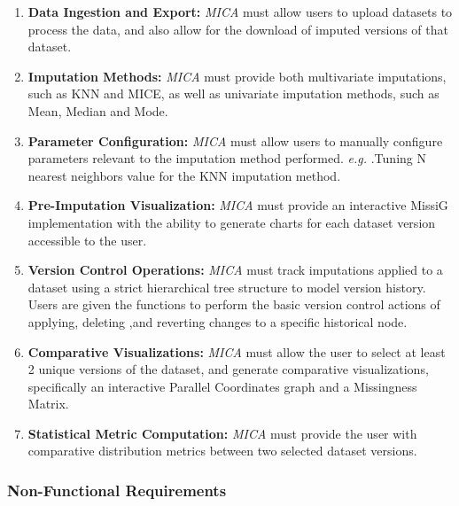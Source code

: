 \documentclass[a4paper, 11pt]{article}
\makeatletter
\newcommand{\eg}{\emph{e.g. }\@ifnextchar.{\!\@gobble}{}}
\newcommand{\mica}{\textit{MICA }}
\makeatother
\begin{document}
\begin{enumerate}[label=F.R.\arabic*]
        \item \textbf{Data Ingestion and Export:} \mica must allow users to
                upload datasets to process the data, and also allow for the
                download of imputed versions of that dataset.

        \item \textbf{Imputation Methods:} \mica must provide both multivariate
                imputations, such as KNN and MICE, as well as univariate
                imputation methods, such as Mean, Median and Mode.

        \item \textbf{Parameter Configuration:} \mica must allow users to
                manually configure parameters relevant to the imputation method
                performed. \eg Tuning N nearest neighbors value for the KNN
                imputation method.

        \item \textbf{Pre-Imputation Visualization:} \mica must provide an
                interactive MissiG implementation with the ability to generate
                charts for each dataset version accessible to the user.

        \item \textbf{Version Control Operations:} \mica must track imputations
                applied to a dataset using a strict hierarchical tree structure
                to model version history. Users are given the functions to
                perform the basic version control actions of applying, deleting
                ,and reverting changes to a specific historical node.

        \item \textbf{Comparative Visualizations:} \mica must allow the user to
                select at least 2 unique versions of the dataset, and generate
                comparative visualizations, specifically an interactive
                Parallel Coordinates graph and a Missingness Matrix.

        \item \textbf{Statistical Metric Computation:} \mica must provide the
                user with comparative distribution metrics between two selected
                dataset versions.
\end{enumerate}

\subsubsection{Non-Functional Requirements}
\end{document}
